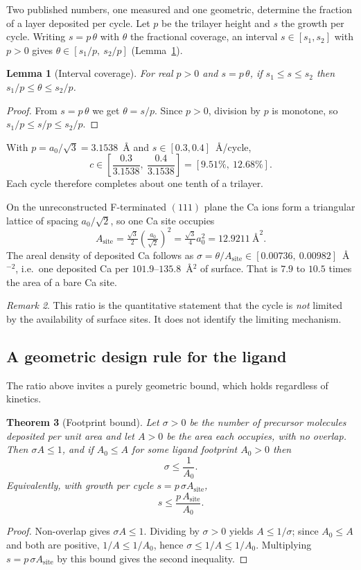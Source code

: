\documentclass[11pt,a4paper]{article}
\theoremstyle{plain}
\newtheorem{theorem}{Theorem}[section]
\newtheorem{lemma}[theorem]{Lemma}
\theoremstyle{definition}
\theoremstyle{remark}
\newtheorem{remark}[theorem]{Remark}
\begin{document}
Two published numbers, one measured and one geometric, determine the fraction
of a layer deposited per cycle. Let $p$ be the trilayer height and $s$ the
growth per cycle. Writing $s = p\,\theta$ with $\theta$ the fractional coverage, an
interval $s\in[s_1,s_2]$ with $p>0$ gives $\theta\in[s_1/p,\ s_2/p]$
(Lemma~\ref{lem:coverage-lean}).

\begin{lemma}[Interval coverage]
\label{lem:coverage-lean}
For real $p>0$ and $s=p\,\theta$, if $s_1\le s\le s_2$ then
$s_1/p\le \theta\le s_2/p$.
\end{lemma}
\begin{proof}
From $s=p\,\theta$ we get $\theta=s/p$. Since $p>0$, division by $p$ is monotone, so
$s_1/p\le s/p\le s_2/p$.
\end{proof}

With $p=a_0/\sqrt3=3.1538$~\AA{} and $s\in[0.3,0.4]$~\AA/cycle,
\[
c \in \left[\frac{0.3}{3.1538},\ \frac{0.4}{3.1538}\right]
  = [9.51\%,\ 12.68\%].
\]
Each cycle therefore completes about one tenth of a trilayer.

On the unreconstructed F-terminated $(111)$ plane the Ca ions form a triangular
lattice of spacing $a_0/\sqrt2$, so one Ca site occupies
\[
A_{\mathrm{site}} = \tfrac{\sqrt3}{2}\left(\tfrac{a_0}{\sqrt2}\right)^2
= \tfrac{\sqrt3}{4}a_0^2 = 12.9211\ \text{\AA}^2 .
\]
The areal density of deposited Ca follows as
$\sigma = \theta/A_{\mathrm{site}} \in [0.00736,\ 0.00982]$~\AA$^{-2}$, i.e.\ one
deposited Ca per $101.9$--$135.8$~\AA$^2$ of surface. That is $7.9$ to $10.5$
times the area of a bare Ca site.

\begin{remark}
This ratio is the quantitative statement that the cycle is \emph{not} limited
by the availability of surface sites. It does not identify the limiting
mechanism.
\end{remark}

\subsection{A geometric design rule for the ligand}

The ratio above invites a purely geometric bound, which holds regardless of
kinetics.

\begin{theorem}[Footprint bound]
\label{thm:footprint}
Let $\sigma>0$ be the number of precursor molecules deposited per unit area and
let $A>0$ be the area each occupies, with no overlap. Then $\sigma A\le1$, and
if $A_0\le A$ for some ligand footprint $A_0>0$ then
\[
\sigma \le \frac{1}{A_0}.
\]
Equivalently, with growth per cycle $s = p\,\sigma A_{\mathrm{site}}$,
\[
s \le \frac{p\,A_{\mathrm{site}}}{A_0}.
\]
\end{theorem}
\begin{proof}
Non-overlap gives $\sigma A\le1$. Dividing by $\sigma>0$ yields
$A\le1/\sigma$; since $A_0\le A$ and both are positive,
$1/A\le1/A_0$, hence $\sigma\le1/A\le1/A_0$. Multiplying
$s=p\,\sigma A_{\mathrm{site}}$ by this bound gives the second inequality.
\end{proof}
\end{document}
